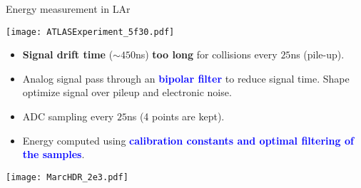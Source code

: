 \begin{frame}{Energy measurement in LAr}
\begin{minipage}{0.3\linewidth}
    \texttt{[image: ATLASExperiment\_5f30.pdf]}
\end{minipage}
\hfill
\begin{minipage}{0.69\linewidth}
\begin{itemize}
\item {\bf Signal drift time }($\sim 450$ns) {\bf too long} for collisions every $25$ns (pile-up).
\item Analog signal pass through an \textcolor{blue}{\bf bipolar filter } to reduce signal time.
Shape optimize signal over pileup and electronic noise.
\item ADC sampling every $25$ns (4 points are kept).
\item Energy computed using \textcolor{blue}{\bf calibration constants and optimal filtering of the samples}.
\end{itemize}
\end{minipage}
\begin{center}
    \texttt{[image: MarcHDR\_2e3.pdf]}
\end{center}

\end{frame}

